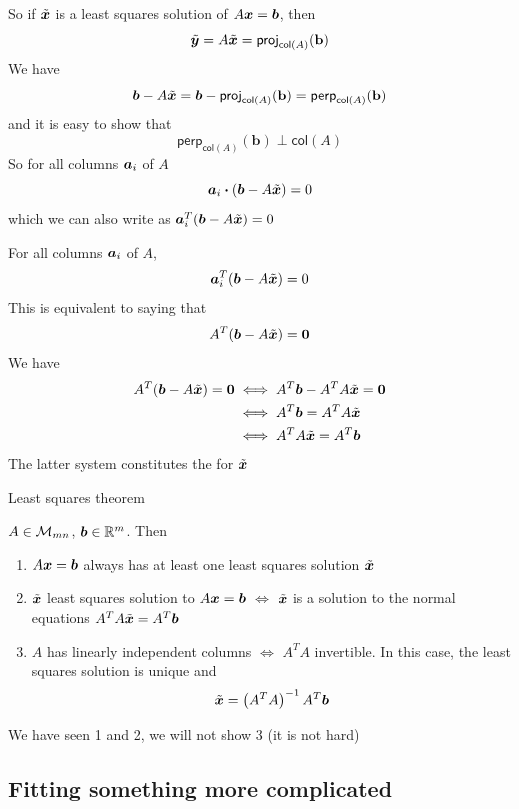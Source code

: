 \documentclass[aspectratio=169]{beamer}
\begin{document}
\begin{frame}
So if $\tilde{\bm{x}}$ is a least squares solution of $A\bm{x}=\bm{b}$, then
\[
\tilde{\bm{y}} = A\tilde{\bm{x}} = \mathsf{proj}_{\mathsf{col}(A)}(\mathbf{b})
\]
\vfill
We have
\[
\bm{b}-A\tilde{\bm{x}} = \bm{b}-\mathsf{proj}_{\mathsf{col}(A)}(\mathbf{b}) 
= \mathsf{perp}_{\mathsf{col}(A)}(\mathbf{b})
\]
and it is easy to show that
\[
\mathsf{perp}_{\mathsf{col}(A)}(\mathbf{b}) \perp \mathsf{col}(A)
\]
\vfill
So for all columns $\bm{a}_i$ of $A$
\[
\bm{a}_i\boldsymbol{\cdot}(\bm{b}-A\tilde{\bm{x}}) = 0
\]
which we can also write as $\bm{a}_i^T(\bm{b}-A\tilde{\bm{x}}) = 0$
\end{frame}

\begin{frame}
For all columns $\bm{a}_i$ of $A$,
\[\bm{a}_i^T(\bm{b}-A\tilde{\bm{x}}) = 0
\]
\vfill
This is equivalent to saying that
\[
A^T(\bb-A\tilde\bx) = \b0
\]
\vfill
We have
\begin{align*}
A^T(\bb-A\tilde\bx) = \b0 &\iff A^T\bb - A^TA\tilde\bx = \b0 \\
&\iff A^T\bb = A^TA\tilde\bx \\
&\iff A^TA\tilde\bx = A^T\bb
\end{align*}
The latter system constitutes the  for $\tilde{\bm{x}}$
\end{frame}


\begin{frame}{Least squares theorem}
\begin{importanttheorem}\label{th:least_squares}
$A\in\mathcal{M}_{mn}$, $\bm{b}\in\mathbb{R}^m$. Then
\begin{enumerate}
\item $A\bm{x}=\bm{b}$ always has at least one least squares solution $\tilde{\bm{x}}$
\item $\tilde{\bm{x}}$ least squares solution to $A\bm{x}=\bm{b}$ $\iff$ $\tilde{\bm{x}}$ is a solution to the normal equations $A^TA\tilde{\bm{x}} = A^T\bm{b}$
\item $A$ has linearly independent columns $\iff$ $A^TA$ invertible.  
\newline In this case, the least squares solution is unique and 
\[
\tilde{\bm{x}} = \left(A^TA\right)^{-1}A^T\bm{b}
\]
\end{enumerate}
\end{importanttheorem}
\vfill
We have seen 1 and 2, we will not show 3 (it is not hard)
\end{frame}


\subsection{Fitting something more complicated}
\end{document}
